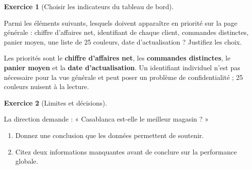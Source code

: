 \documentclass[
  french,
  letterpaper,
  open=any]{scrbook}
\providecommand{\tightlist}{%
  \setlength{\itemsep}{0pt}\setlength{\parskip}{0pt}}
\theoremstyle{definition}
\theoremstyle{definition}
\newtheorem{exercise}{Exercice}[section]
\theoremstyle{remark}
\begin{document}
\begin{exercise}[Choisir les indicateurs du tableau de
bord]\protect\hypertarget{exr-cas-7}{}\label{exr-cas-7}

Parmi les éléments suivants, lesquels doivent apparaître en priorité sur
la page générale : chiffre d'affaires net, identifiant de chaque client,
commandes distinctes, panier moyen, une liste de 25 couleurs, date
d'actualisation ? Justifiez les choix.

\end{exercise}

\begin{tcolorbox}[enhanced jigsaw, arc=.35mm, bottomrule=.15mm, bottomtitle=1mm, breakable, colback=white, colbacktitle=quarto-callout-tip-color!10!white, colframe=quarto-callout-tip-color-frame, coltitle=black, left=2mm, leftrule=.75mm, opacityback=0, opacitybacktitle=0.6, rightrule=.15mm, title=\textcolor{quarto-callout-tip-color}{\faLightbulb}\hspace{0.5em}{Solution de l'exercice Exercice~\ref{exr-cas-7}}, titlerule=0mm, toprule=.15mm, toptitle=1mm]

Les priorités sont le \textbf{chiffre d'affaires net}, les
\textbf{commandes distinctes}, le \textbf{panier moyen} et la
\textbf{date d'actualisation}. Un identifiant individuel n'est pas
nécessaire pour la vue générale et peut poser un problème de
confidentialité ; 25 couleurs nuisent à la lecture.

\end{tcolorbox}

\begin{exercise}[Limites et
décisions]\protect\hypertarget{exr-cas-8}{}\label{exr-cas-8}

La direction demande : « Casablanca est-elle le meilleur magasin ? »

\begin{enumerate}
\def\labelenumi{\alph{enumi}.}
\tightlist
\item
  Donnez une conclusion que les données permettent de soutenir.
\item
  Citez deux informations manquantes avant de conclure sur la
  performance globale.
\end{enumerate}

\end{exercise}
\end{document}
